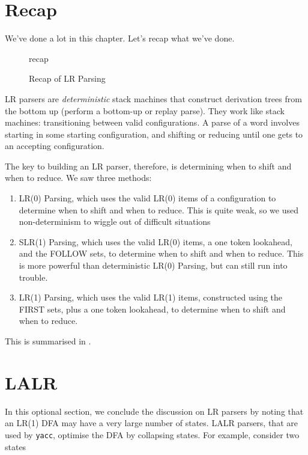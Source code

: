 \section{Recap}
We've done a lot in this chapter. Let's recap what we've done. 

\begin{figure}[H]
    \centering
    {recap}
    \caption{Recap of LR Parsing}
    \label{fig:lr-parsing-recap}
\end{figure}

LR parsers are \textit{deterministic} stack machines that construct derivation trees from the bottom up (perform a bottom-up or replay parse). They work like stack machines: transitioning between valid configurations. A parse of a word involves starting in some starting configuration, and shifting or reducing until one gets to an accepting configuration. 

The key to building an LR parser, therefore, is determining when to shift and when to reduce. We saw three methods:

\begin{enumerate}
    \item LR(0) Parsing, which uses the valid LR(0) items of a configuration to determine when to shift and when to reduce. This is quite weak, so we used non-determinism to wiggle out of difficult situations
    \item SLR(1) Parsing, which uses the valid LR(0) items, a one token lookahead, and the FOLLOW sets, to determine when to shift and when to reduce. This is more powerful than deterministic LR(0) Parsing, but can still run into trouble. 
    \item LR(1) Parsing, which uses the valid LR(1) items, constructed using the FIRST sets, plus a one token lookahead, to determine when to shift and when to reduce.
\end{enumerate}

This is summarised in .

\section{LALR\optional}
In this optional section, we conclude the discussion on LR parsers by noting that an LR(1) DFA may have a very large number of states. LALR parsers, that are used by \texttt{yacc}, optimise the DFA by collapsing states. For example, consider two states

